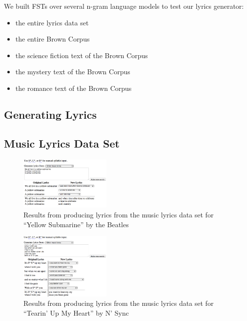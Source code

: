 \documentclass{vgtc}                          %
\begin{document}
We built FSTs over several n-gram language models to test our lyrics generator:
\begin{itemize}
  \item the entire lyrics data set
  \item the entire Brown Corpus
  \item the science fiction text of the Brown Corpus
  \item the mystery text of the Brown Corpus
  \item the romance text of the Brown Corpus
\end{itemize}


\subsection{Generating Lyrics}

\subsection{Music Lyrics Data Set}
\begin{figure}[t]
\centering
\includegraphics[width=0.4\textwidth]{images/png/yellow_submarine4.png}
\caption{Results from producing lyrics from the music lyrics data set for ``Yellow Submarine'' by the Beatles}
\label{fig:beatles}
\end{figure}

\begin{figure}[t]
\centering
\includegraphics[width=0.4\textwidth]{images/png/tumh3.png}
\caption{Results from producing lyrics from the music lyrics data set for ``Tearin' Up My Heart'' by
N' Sync}
\label{fig:beatles}
\end{figure}
\end{document}
